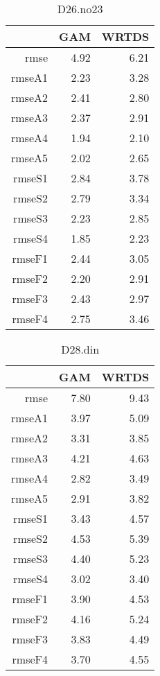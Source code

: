 \documentclass[12pt]{amsart}
\begin{document}
\begin{table}[H]
\centering
\begin{tabular}{rrr}
  \hline
 & GAM & WRTDS \\ 
  \hline
rmse & 4.92 & 6.21 \\ 
  rmseA1 & 2.23 & 3.28 \\ 
  rmseA2 & 2.41 & 2.80 \\ 
  rmseA3 & 2.37 & 2.91 \\ 
  rmseA4 & 1.94 & 2.10 \\ 
  rmseA5 & 2.02 & 2.65 \\ 
  rmseS1 & 2.84 & 3.78 \\ 
  rmseS2 & 2.79 & 3.34 \\ 
  rmseS3 & 2.23 & 2.85 \\ 
  rmseS4 & 1.85 & 2.23 \\ 
  rmseF1 & 2.44 & 3.05 \\ 
  rmseF2 & 2.20 & 2.91 \\ 
  rmseF3 & 2.43 & 2.97 \\ 
  rmseF4 & 2.75 & 3.46 \\ 
   \hline
\end{tabular}
\caption{D26.no23}
\end{table}


\begin{table}[H]
\centering
\begin{tabular}{rrr}
  \hline
 & GAM & WRTDS \\ 
  \hline
rmse & 7.80 & 9.43 \\ 
  rmseA1 & 3.97 & 5.09 \\ 
  rmseA2 & 3.31 & 3.85 \\ 
  rmseA3 & 4.21 & 4.63 \\ 
  rmseA4 & 2.82 & 3.49 \\ 
  rmseA5 & 2.91 & 3.82 \\ 
  rmseS1 & 3.43 & 4.57 \\ 
  rmseS2 & 4.53 & 5.39 \\ 
  rmseS3 & 4.40 & 5.23 \\ 
  rmseS4 & 3.02 & 3.40 \\ 
  rmseF1 & 3.90 & 4.53 \\ 
  rmseF2 & 4.16 & 5.24 \\ 
  rmseF3 & 3.83 & 4.49 \\ 
  rmseF4 & 3.70 & 4.55 \\ 
   \hline
\end{tabular}
\caption{D28.din}
\end{table}
\end{document}
